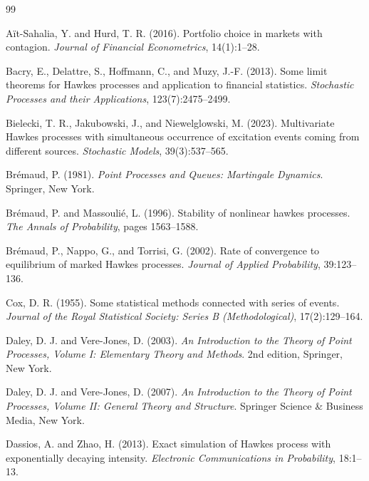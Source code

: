 \documentclass[12pt,a4paper]{report}
\theoremstyle{plain}
\theoremstyle{definition}
\theoremstyle{remark}
\newcommand{\1}{\mathbf{1}}
\begin{document}
\clearpage
{}
\begin{thebibliography}{99}

A{\"i}t-Sahalia, Y. and Hurd, T. R. (2016).
\newblock Portfolio choice in markets with contagion.
\newblock \emph{Journal of Financial Econometrics}, 14(1):1--28.

Bacry, E., Delattre, S., Hoffmann, C., and Muzy, J.-F. (2013).
\newblock Some limit theorems for {H}awkes processes and application to financial statistics.
\newblock \emph{Stochastic Processes and their Applications}, 123(7):2475--2499.

Bielecki, T. R., Jakubowski, J., and Niewelglowski, M. (2023).
\newblock Multivariate Hawkes processes with simultaneous occurrence of excitation events coming from different sources.
\newblock \emph{Stochastic Models}, 39(3):537--565.

Br\'emaud, P. (1981).
\newblock \emph{Point Processes and Queues: Martingale Dynamics}.
\newblock Springer, New York.

Br{\'e}maud, P. and Massouli{\'e}, L. (1996).
\newblock Stability of nonlinear hawkes processes.
\newblock \emph{The Annals of Probability}, pages 1563--1588.

Br\'emaud, P., Nappo, G., and Torrisi, G. (2002).
\newblock Rate of convergence to equilibrium of marked Hawkes processes.
\newblock \emph{Journal of Applied Probability}, 39:123--136.

Cox, D. R. (1955).
\newblock Some statistical methods connected with series of events.
\newblock \emph{Journal of the Royal Statistical Society: Series B (Methodological)}, 17(2):129--164.

Daley, D. J. and Vere-Jones, D. (2003).
\newblock \emph{An Introduction to the Theory of Point Processes, Volume I: Elementary Theory and Methods}.
\newblock 2nd edition, Springer, New York.

Daley, D. J. and Vere-Jones, D. (2007).
\newblock \emph{An Introduction to the Theory of Point Processes, Volume II: General Theory and Structure}.
\newblock Springer Science \& Business Media, New York.

Dassios, A. and Zhao, H. (2013).
\newblock Exact simulation of Hawkes process with exponentially decaying intensity.
\newblock \emph{Electronic Communications in Probability}, 18:1--13.


\end{thebibliography}
\end{document}
